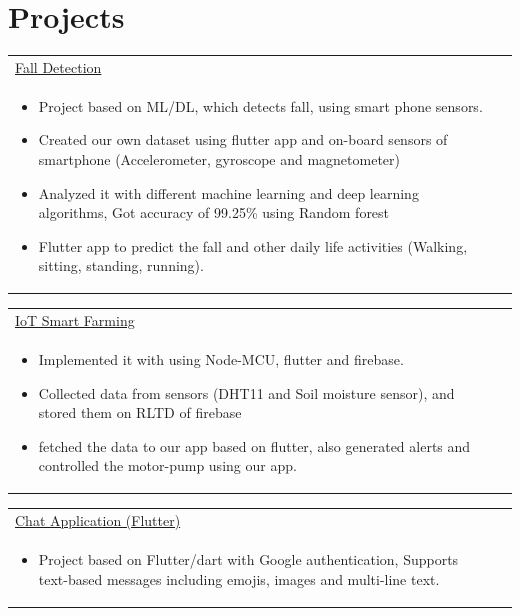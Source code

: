 \documentclass[a4paper,4pt]{article}
\begin{document}
\section{Projects}

\begin{tabularx}{\linewidth}{ @{}l r@{} }
\href{https://github.com/vishalsingh17-web2/IoT-domain}{Fall Detection} \\
\begin{minipage}[t]{\linewidth}
    \begin{itemize}
        \item[--] \small Project based on ML/DL, which detects fall, using smart phone sensors.
        \item[--] \small Created our own dataset using flutter app and on-board sensors of smartphone (Accelerometer, gyroscope and magnetometer)
        \item[--] \small Analyzed it with different machine learning and deep learning algorithms, Got accuracy of 99.25\% using Random forest
        \item[--] \small Flutter app to predict the fall and other daily life activities (Walking, sitting, standing, running).
    \end{itemize}
\end{minipage}
\end{tabularx}

\begin{tabularx}{\linewidth}{ @{}l r@{} }
\href{https://github.com/vishalsingh17-web2/IoT-Project}{IoT Smart Farming} \\
\begin{minipage}[t]{\linewidth}
    \begin{itemize}
        \item[--] \small Implemented it with using Node-MCU, flutter and firebase.
        \item[--] \small Collected data from sensors (DHT11 and Soil moisture sensor), and stored
them on RLTD of firebase
        \item[--] \small fetched the data to our app based on flutter, also generated alerts and controlled the motor-pump using our app.
    \end{itemize}
\end{minipage}
\end{tabularx}

\begin{tabularx}{\linewidth}{ @{}l r@{} }
\href{https://github.com/vishalsingh17-web2/chatBuzz/tree/app}{Chat Application (Flutter)} \\
\begin{minipage}[t]{\linewidth}
    \begin{itemize}
        \item[--] \small Project based on Flutter/dart with Google authentication, Supports text-based messages including emojis, images and multi-line text.
    \end{itemize}
\end{minipage}
\end{tabularx}
\end{document}
